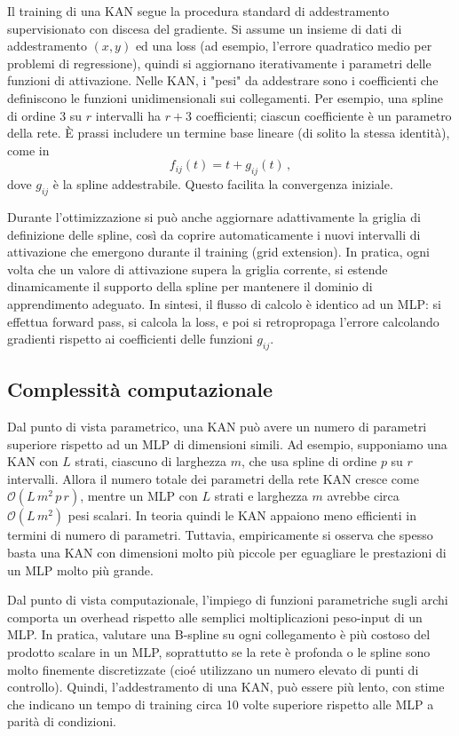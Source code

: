 \documentclass[a4paper,12pt]{report}
\begin{document}
	Il training di una KAN segue la procedura standard di addestramento supervisionato con discesa del gradiente. Si assume un insieme di dati di addestramento $(x,y)$ ed una loss (ad esempio, l’errore quadratico medio per problemi di regressione), quindi si aggiornano iterativamente i parametri delle funzioni di attivazione. Nelle KAN, i "pesi" da addestrare sono i coefficienti che definiscono le funzioni unidimensionali sui collegamenti. Per esempio, una spline di ordine 3 su $r$ intervalli ha $r+3$ coefficienti; ciascun coefficiente è un parametro della rete. È prassi includere un termine base lineare (di solito la stessa identità), come in 
	\[
	f_{ij}(t) = t + g_{ij}(t)\,, 
	\]
	dove $g_{ij}$ è la spline addestrabile. Questo facilita la convergenza iniziale.
	
	Durante l’ottimizzazione si può anche aggiornare adattivamente la griglia di definizione delle spline, così da coprire automaticamente i nuovi intervalli di attivazione che emergono durante il training (grid extension). In pratica, ogni volta che un valore di attivazione supera la griglia corrente, si estende dinamicamente il supporto della spline per mantenere il dominio di apprendimento adeguato. In sintesi, il flusso di calcolo è identico ad un MLP: si effettua forward pass, si calcola la loss, e poi si retropropaga l’errore calcolando gradienti rispetto ai coefficienti delle funzioni $g_{ij}$.
	
	\subsection{Complessità computazionale}
	
	Dal punto di vista parametrico, una KAN può avere un numero di parametri superiore rispetto ad un MLP di dimensioni simili. Ad esempio, supponiamo una KAN con $L$ strati, ciascuno di larghezza $m$, che usa spline di ordine $p$ su $r$ intervalli. Allora il numero totale dei parametri della rete KAN cresce come $\mathcal{O}(L\,m^2\,p\,r)$, mentre un MLP con $L$ strati e larghezza $m$ avrebbe circa $\mathcal{O}(L\,m^2)$ pesi scalari. In teoria quindi le KAN appaiono meno efficienti in termini di numero di parametri. Tuttavia, empiricamente si osserva che spesso basta una KAN con dimensioni molto più piccole per eguagliare le prestazioni di un MLP molto più grande.
	
	Dal punto di vista computazionale, l’impiego di funzioni parametriche sugli archi comporta un overhead rispetto alle semplici moltiplicazioni peso-input di un MLP. In pratica, valutare una B-spline su ogni collegamento è più costoso del prodotto scalare in un MLP, soprattutto se la rete è profonda o le spline sono molto finemente discretizzate (cioé utilizzano un numero elevato di punti di controllo). Quindi, l'addestramento di una KAN, può essere più lento, con stime che indicano un tempo di training circa 10 volte superiore rispetto alle MLP a parità di condizioni.
	
\end{document}
